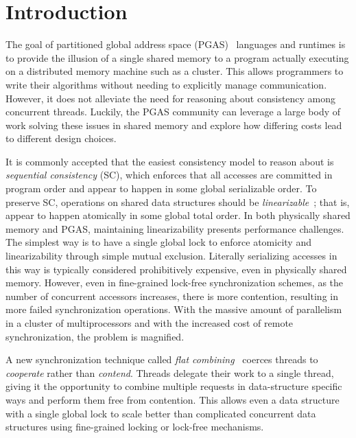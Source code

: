 \section{Introduction}
The goal of partitioned global address space (PGAS)~\cite{upc:2005} languages and runtimes is to provide the illusion of a single shared memory to a program actually executing on a distributed memory machine such as a cluster. This allows programmers to write their algorithms without needing to explicitly manage communication.
However, it does not alleviate the need for reasoning about consistency among concurrent threads.
Luckily, the PGAS community can leverage a large body of work solving these issues in shared memory and explore how differing costs lead to different design choices.

It is commonly accepted that the easiest consistency model to reason about is \emph{sequential consistency} (SC), which enforces that all accesses are committed in program order and appear to happen in some global serializable order.
To preserve SC, operations on shared data structures should be \emph{linearizable}~\cite{herlihy1990linearizability}; that is, appear to happen atomically in some global total order.
In both physically shared memory and PGAS, maintaining linearizability presents performance challenges.
The simplest way is to have a single global lock to enforce atomicity and linearizability through simple mutual exclusion. Literally serializing accesses in this way is typically considered prohibitively expensive, even in physically shared memory.
However, even in fine-grained lock-free synchronization schemes, as the number of concurrent accessors increases, there is more contention, resulting in more failed synchronization operations.
With the massive amount of parallelism in a cluster of multiprocessors and with the increased cost of remote synchronization, the problem is magnified.

A new synchronization technique called \emph{flat combining}~\cite{flatCombining} coerces threads to \emph{cooperate} rather than \emph{contend}.
Threads delegate their work to a single thread, giving it the opportunity to combine multiple requests in data-structure specific ways and perform them free from contention.
This allows even a data structure with a single global lock to scale better than complicated concurrent data structures using fine-grained locking or lock-free mechanisms.

